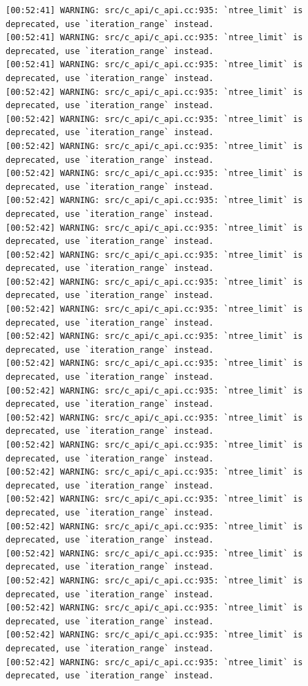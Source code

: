 \documentclass[
  letterpaper,
  DIV=11,
  numbers=noendperiod]{scrartcl}
\begin{document}
\begin{verbatim}
[00:52:41] WARNING: src/c_api/c_api.cc:935: `ntree_limit` is deprecated, use `iteration_range` instead.
[00:52:41] WARNING: src/c_api/c_api.cc:935: `ntree_limit` is deprecated, use `iteration_range` instead.
[00:52:41] WARNING: src/c_api/c_api.cc:935: `ntree_limit` is deprecated, use `iteration_range` instead.
[00:52:42] WARNING: src/c_api/c_api.cc:935: `ntree_limit` is deprecated, use `iteration_range` instead.
[00:52:42] WARNING: src/c_api/c_api.cc:935: `ntree_limit` is deprecated, use `iteration_range` instead.
[00:52:42] WARNING: src/c_api/c_api.cc:935: `ntree_limit` is deprecated, use `iteration_range` instead.
[00:52:42] WARNING: src/c_api/c_api.cc:935: `ntree_limit` is deprecated, use `iteration_range` instead.
[00:52:42] WARNING: src/c_api/c_api.cc:935: `ntree_limit` is deprecated, use `iteration_range` instead.
[00:52:42] WARNING: src/c_api/c_api.cc:935: `ntree_limit` is deprecated, use `iteration_range` instead.
[00:52:42] WARNING: src/c_api/c_api.cc:935: `ntree_limit` is deprecated, use `iteration_range` instead.
[00:52:42] WARNING: src/c_api/c_api.cc:935: `ntree_limit` is deprecated, use `iteration_range` instead.
[00:52:42] WARNING: src/c_api/c_api.cc:935: `ntree_limit` is deprecated, use `iteration_range` instead.
[00:52:42] WARNING: src/c_api/c_api.cc:935: `ntree_limit` is deprecated, use `iteration_range` instead.
[00:52:42] WARNING: src/c_api/c_api.cc:935: `ntree_limit` is deprecated, use `iteration_range` instead.
[00:52:42] WARNING: src/c_api/c_api.cc:935: `ntree_limit` is deprecated, use `iteration_range` instead.
[00:52:42] WARNING: src/c_api/c_api.cc:935: `ntree_limit` is deprecated, use `iteration_range` instead.
[00:52:42] WARNING: src/c_api/c_api.cc:935: `ntree_limit` is deprecated, use `iteration_range` instead.
[00:52:42] WARNING: src/c_api/c_api.cc:935: `ntree_limit` is deprecated, use `iteration_range` instead.
[00:52:42] WARNING: src/c_api/c_api.cc:935: `ntree_limit` is deprecated, use `iteration_range` instead.
[00:52:42] WARNING: src/c_api/c_api.cc:935: `ntree_limit` is deprecated, use `iteration_range` instead.
[00:52:42] WARNING: src/c_api/c_api.cc:935: `ntree_limit` is deprecated, use `iteration_range` instead.
[00:52:42] WARNING: src/c_api/c_api.cc:935: `ntree_limit` is deprecated, use `iteration_range` instead.
[00:52:42] WARNING: src/c_api/c_api.cc:935: `ntree_limit` is deprecated, use `iteration_range` instead.
[00:52:42] WARNING: src/c_api/c_api.cc:935: `ntree_limit` is deprecated, use `iteration_range` instead.
[00:52:42] WARNING: src/c_api/c_api.cc:935: `ntree_limit` is deprecated, use `iteration_range` instead.

\end{verbatim}
\end{document}
